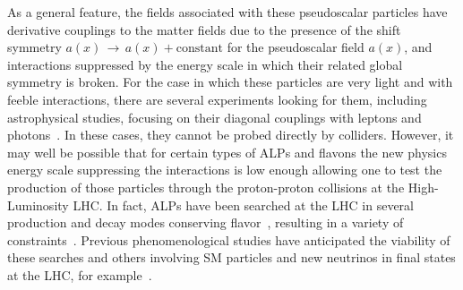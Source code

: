\documentclass[prd,amsfonts,onecolumn,superscriptaddress,aps,nofootinbib,11pt]{revtex4-1}
\begin{document}
As a general feature, the fields associated with these pseudoscalar particles have derivative couplings to the matter fields due to the presence of the shift symmetry $a(x)\,\rightarrow\,a(x)+\mathrm{constant}$ for the pseudoscalar field $a(x)$, and interactions suppressed by the energy scale in which their related global symmetry is broken. For the case in which these particles are very light and with feeble interactions, there are several experiments looking for them, including  astrophysical studies,  focusing on their diagonal couplings with leptons and photons~\cite{Workman:2022ynf,DiLuzio:2020wdo}. In these cases, they cannot be probed directly by colliders. However, it may well be possible that for certain types of ALPs and flavons the new physics energy scale suppressing the interactions is low enough allowing one to test the production of those particles through the proton-proton collisions at the High-Luminosity LHC. In fact, ALPs have been searched at the LHC in several production and decay modes conserving flavor~\cite{dEnterria:2013zqi, CidVidal:2018blh, Goncalves:2021pdc,CMS:2018nsh, CMS:2019spf, ATLAS:2020ahi, CMS:2020ffa, ATLAS:2021hbr,ATLAS:2020pcy,dEnterria:2013zqi, CidVidal:2018blh, Goncalves:2021pdc,CMS:2018nsh, ATLAS:2020ahi, CMS:2020ffa, ATLAS:2021hbr,CMS:2020ffa,CMS:2018nsh, CMS:2019spf, ATLAS:2021hbr}, resulting in a variety of constraints~\cite{d'Enterria:2753504}. Previous phenomenological studies have anticipated the viability of these searches and others involving SM particles and new neutrinos in final states at the LHC, for example~\cite{Mimasu:2014nea,Brivio:2017ije,Bauer:2018uxu,Bauer:2017ris,Bauer:2017nlg,Jaeckel:2015jla,Alves:2016koo,Alves:2019xpc,Gavela:2019cmq,Merlo:2019anv,Baldenegro:2019whq,Dobrich:2015jyk,Harland-Lang:2019zur,Dobrich:2019dxc,Hahn:1404985,Alekhin:2015byh,Feng:2018pew,Aloni:2019ruo,Alves:2021puo,Knapen:2021elo,Alonso-Alvarez:2023wni,Cheung:2023nzg}. 
\end{document}
